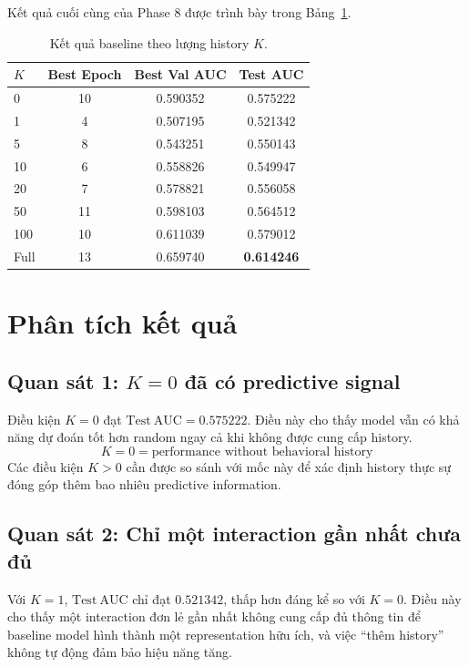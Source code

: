 \documentclass[12pt,a4paper]{article}
\begin{document}
Kết quả cuối cùng của Phase 8 được trình bày trong Bảng~\ref{tab:results}.

\begin{table}[H]
\centering
\caption{Kết quả baseline theo lượng history $K$.}
\label{tab:results}
\begin{tabular}{lccc}
\toprule
\textbf{$K$} & \textbf{Best Epoch} & \textbf{Best Val AUC} & \textbf{Test AUC} \\
\midrule
0       & 10 & 0.590352 & 0.575222 \\
1       & 4  & 0.507195 & 0.521342 \\
5       & 8  & 0.543251 & 0.550143 \\
10      & 6  & 0.558826 & 0.549947 \\
20      & 7  & 0.578821 & 0.556058 \\
50      & 11 & 0.598103 & 0.564512 \\
100     & 10 & 0.611039 & 0.579012 \\
Full    & 13 & 0.659740 & \textbf{0.614246} \\
\bottomrule
\end{tabular}
\end{table}

\section{Phân tích kết quả}

\subsection{Quan sát 1: $K=0$ đã có predictive signal}
Điều kiện $K=0$ đạt $\mathrm{Test\ AUC} = 0.575222$. Điều này cho thấy model vẫn có khả năng dự đoán tốt hơn random ngay cả khi không được cung cấp history. 
\[
\boxed{ K=0 = \text{performance without behavioral history} }
\]
Các điều kiện $K>0$ cần được so sánh với mốc này để xác định history thực sự đóng góp thêm bao nhiêu predictive information.

\subsection{Quan sát 2: Chỉ một interaction gần nhất chưa đủ}
Với $K=1$, $\mathrm{Test\ AUC}$ chỉ đạt $0.521342$, thấp hơn đáng kể so với $K=0$. Điều này cho thấy một interaction đơn lẻ gần nhất không cung cấp đủ thông tin để baseline model hình thành một representation hữu ích, và việc ``thêm history'' không tự động đảm bảo hiệu năng tăng.
\end{document}
